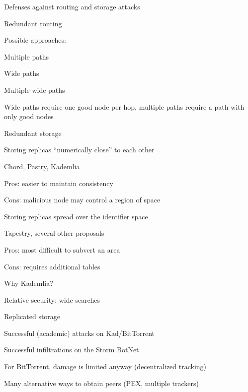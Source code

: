 \begin{frame}{Defenses against routing and storage attacks}

\BIL
\item \alert{Redundant routing}
  \BI
  \item Possible approaches:
	  \BI
	  \item Multiple paths
	  \item Wide paths
	  \item Multiple wide paths
	  \EI
  \item Wide paths require one good node per hop, multiple paths require
    a path with only good nodes
  \EI
\item \alert{Redundant storage} 
  \BI
  \item Storing replicas “numerically close” to each other
    \BI
       \item Chord, Pastry, Kademlia
	   \item Pros: easier to maintain consistency
	   \item Cons: malicious node may control a region of space
    \EI
  \item Storing replicas spread over the identifier space
    \BI
       \item Tapestry, several other proposals
       \item Pros: most difficult to subvert an area
       \item Cons: requires additional tables
    \EI
  \EI
\EIL

\end{frame}

\begin{frame}{Why Kademlia?}

\BI
\item Relative security: wide searches
\item Replicated storage
\EI

\smallskip
{}
\BI
\item Successful (academic) attacks on Kad/BitTorrent
\item Successful infiltrations on the Storm BotNet
\EI

\smallskip
{}
\BI
\item For BitTorrent, damage is limited anyway (decentralized tracking)
\item Many alternative ways to obtain peers (PEX, multiple trackers)
\EI


\end{frame}


